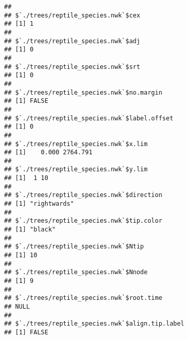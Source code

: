 \documentclass[]{article}
\newenvironment{Shaded}{\begin{snugshade}}{\end{snugshade}}
\newcommand{\KeywordTok}[1]{\textcolor[rgb]{0.13,0.29,0.53}{\textbf{#1}}}
\newcommand{\DataTypeTok}[1]{\textcolor[rgb]{0.13,0.29,0.53}{#1}}
\newcommand{\StringTok}[1]{\textcolor[rgb]{0.31,0.60,0.02}{#1}}
\newcommand{\CommentTok}[1]{\textcolor[rgb]{0.56,0.35,0.01}{\textit{#1}}}
\newcommand{\ControlFlowTok}[1]{\textcolor[rgb]{0.13,0.29,0.53}{\textbf{#1}}}
\newcommand{\OperatorTok}[1]{\textcolor[rgb]{0.81,0.36,0.00}{\textbf{#1}}}
\newcommand{\NormalTok}[1]{#1}
\begin{document}
\begin{verbatim}
## 
## $`./trees/reptile_species.nwk`$cex
## [1] 1
## 
## $`./trees/reptile_species.nwk`$adj
## [1] 0
## 
## $`./trees/reptile_species.nwk`$srt
## [1] 0
## 
## $`./trees/reptile_species.nwk`$no.margin
## [1] FALSE
## 
## $`./trees/reptile_species.nwk`$label.offset
## [1] 0
## 
## $`./trees/reptile_species.nwk`$x.lim
## [1]    0.000 2764.791
## 
## $`./trees/reptile_species.nwk`$y.lim
## [1]  1 10
## 
## $`./trees/reptile_species.nwk`$direction
## [1] "rightwards"
## 
## $`./trees/reptile_species.nwk`$tip.color
## [1] "black"
## 
## $`./trees/reptile_species.nwk`$Ntip
## [1] 10
## 
## $`./trees/reptile_species.nwk`$Nnode
## [1] 9
## 
## $`./trees/reptile_species.nwk`$root.time
## NULL
## 
## $`./trees/reptile_species.nwk`$align.tip.label
## [1] FALSE
\end{verbatim}

\begin{Shaded}
\end{Shaded}
\end{document}
